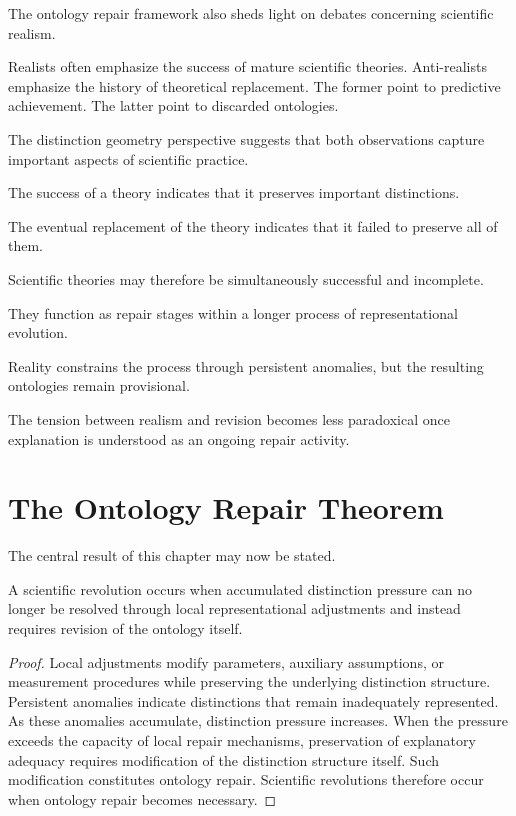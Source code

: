 \documentclass[11pt,oneside,openany]{book}
\begin{document}
The ontology repair framework also sheds light on debates concerning scientific realism.

Realists often emphasize the success of mature scientific theories. Anti-realists emphasize the history of theoretical replacement. The former point to predictive achievement. The latter point to discarded ontologies.

The distinction geometry perspective suggests that both observations capture important aspects of scientific practice.

The success of a theory indicates that it preserves important distinctions.

The eventual replacement of the theory indicates that it failed to preserve all of them.

Scientific theories may therefore be simultaneously successful and incomplete.

They function as repair stages within a longer process of representational evolution.

Reality constrains the process through persistent anomalies, but the resulting ontologies remain provisional.

The tension between realism and revision becomes less paradoxical once explanation is understood as an ongoing repair activity.

\section{The Ontology Repair Theorem}

The central result of this chapter may now be stated.

\begin{theorem}

A scientific revolution occurs when accumulated distinction pressure can no longer be resolved through local representational adjustments and instead requires revision of the ontology itself.

\end{theorem}

\begin{proof}

Local adjustments modify parameters, auxiliary assumptions, or measurement procedures while preserving the underlying distinction structure. Persistent anomalies indicate distinctions that remain inadequately represented. As these anomalies accumulate, distinction pressure increases. When the pressure exceeds the capacity of local repair mechanisms, preservation of explanatory adequacy requires modification of the distinction structure itself. Such modification constitutes ontology repair. Scientific revolutions therefore occur when ontology repair becomes necessary.

\end{proof}
\end{document}
